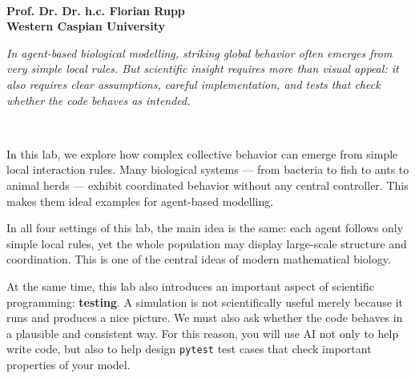 \documentclass[paper=letter, fontsize=12pt]{article}
\numberwithin{equation}{section}
\begin{document}
\thispagestyle{fancy} %

\begin{center}
\\[7mm]
\end{center}

\begin{center}
{\fontsize{14pt}{10pt}\selectfont\textbf{Prof. Dr. Dr. h.c. Florian Rupp \\[2mm]
Western Caspian University}}
\end{center}

\vspace*{0.2cm}

				\begin{flushright}
				\begin{minipage}[b]{8 cm}
				{\it In agent-based biological modelling, striking global behavior often emerges from very simple
				local rules. But scientific insight requires more than visual appeal: it also requires clear assumptions,
				careful implementation, and tests that check whether the code behaves as intended.}
				\end{minipage}\\
				\end{flushright} %

\vspace*{0.7cm}

\noindent In this lab, we explore how complex collective behavior can emerge from simple local interaction rules. Many biological systems --- from bacteria to fish to ants to animal herds --- exhibit coordinated behavior without any central controller. This makes them ideal examples for agent-based modelling.

In all four settings of this lab, the main idea is the same: each agent follows only simple local rules, yet the whole population may display large-scale structure and coordination. This is one of the central ideas of modern mathematical biology.

At the same time, this lab also introduces an important aspect of scientific programming: \textbf{testing}. A simulation is not scientifically useful merely because it runs and produces a nice picture. We must also ask whether the code behaves in a plausible and consistent way. For this reason, you will use AI not only to help write code, but also to help design \texttt{pytest} test cases that check important properties of your model.
\end{document}
